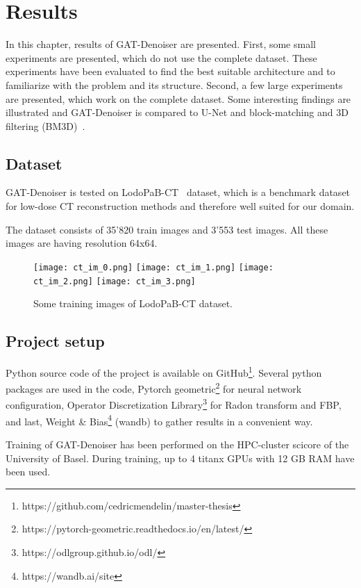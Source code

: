 \chapter{Results}
\label{sec:results}

In this chapter, results of GAT-Denoiser are presented.
First, some small experiments are presented, which do not use the complete dataset.
These experiments have been evaluated to find the best suitable architecture and to 
familiarize with the problem and its structure.
Second, a few large experiments are presented, which work on the complete dataset.
Some interesting findings are illustrated and GAT-Denoiser
is compared to U-Net and block-matching and 3D filtering (BM3D)~\cite{bm3d}.


\section{Dataset}
GAT-Denoiser is tested on LodoPaB-CT~\cite{lodopab-dataset} dataset, which is a 
benchmark dataset for low-dose CT reconstruction methods and therefore well suited for our domain.

The dataset consists of 35'820 train images and 3'553 test images.
All these images are having resolution 64x64.

\begin{figure}[H]
  \centering
  \hfill
  \texttt{[image: ct\_im\_0.png]}
  \hfill
  \texttt{[image: ct\_im\_1.png]}
  \hfill
  \texttt{[image: ct\_im\_2.png]}
  \hfill
  \texttt{[image: ct\_im\_3.png]}
  \hfill
  \caption{Some training images of LodoPaB-CT dataset.}
\end{figure}



\section{Project setup}
Python source code of the project is available on GitHub\footnote{https://github.com/cedricmendelin/master-thesis}.
Several python packages are used in the code, Pytorch geometric\footnote{https://pytorch-geometric.readthedocs.io/en/latest/} 
for neural network configuration, Operator Discretization Library\footnote{https://odlgroup.github.io/odl/} for Radon transform and FBP, 
and last, Weight \& Bias\footnote{https://wandb.ai/site} (wandb) to gather results in a convenient way.

Training of GAT-Denoiser has been performed on the HPC-cluster scicore of the University of Basel.
During training, up to 4 titanx GPUs with 12 GB RAM have been used.


